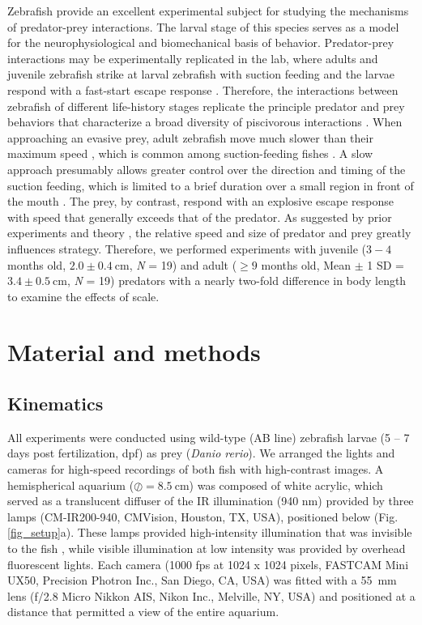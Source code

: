 \documentclass[]{rsos}%
\begin{document}
Zebrafish provide an excellent experimental subject for studying the mechanisms of predator-prey interactions. 
The larval stage of this species serves as a model for the neurophysiological \cite{Bianco:2015gm,Bagnall:2014iu,Huang:2013vj} and biomechanical \cite{Muller:2004hp,Li:2016cy} basis of behavior.
Predator-prey interactions may be experimentally replicated in the lab, where adults and juvenile zebrafish strike at larval zebrafish with suction feeding and the larvae respond with a fast-start escape response \cite{Stewart:2013bha}.
Therefore, the interactions between zebrafish of different life-history stages replicate the principle predator and prey behaviors that characterize a broad diversity of piscivorous interactions \cite{Weihs:1984tb,Walker:2005vn}. 
When approaching an evasive prey, adult zebrafish move much slower than their maximum speed \cite{Stewart:2013bha}, which is common among suction-feeding fishes \cite{Webb:1984jz,Higham:2007go}.
A slow approach presumably allows greater control over the direction and timing of the suction feeding, which is limited to a brief duration over a small region in front of the mouth \cite{Holzman:2008jc,Holzman:2009uu}. 
The prey, by contrast, respond with an explosive escape response with speed that generally exceeds that of the predator. 
As suggested by prior experiments \cite{Fuiman:1994td} and theory \cite{Weihs:1984tb}, the relative speed and size of predator and prey greatly influences strategy.
Therefore, we performed experiments with juvenile ($3-4$ months old, $2.0  \pm  \SI{0.4}{\cm}$, \textit{N} = 19) and adult ($\geq 9$ months old, Mean $\pm$ 1 SD = $3.4 \pm \SI{0.5}{\cm}$, \textit{N} = 19) predators with a nearly two-fold difference in body length to examine the effects of scale.


\section{Material and methods}

\subsection{Kinematics}
All experiments were conducted using  wild-type (AB line) zebrafish larvae (5 -- 7 days post fertilization, dpf) as prey (\textit{Danio rerio}). 
We arranged the lights and cameras for high-speed recordings of both fish with high-contrast images. 
A hemispherical aquarium ($\oslash = \SI{8.5}{\cm}$) was composed of white acrylic, which served as a translucent diffuser of the IR illumination (940 nm) provided by three lamps (CM-IR200-940, CMVision, Houston, TX, USA), positioned below (Fig. \ref{fig_setup}a). 
These lamps provided high-intensity illumination that was invisible to the fish \cite{Robinson:1993tu}, while visible illumination at low intensity was provided by overhead fluorescent lights.
Each camera (1000 fps at 1024 x 1024 pixels, FASTCAM Mini UX50, Precision Photron Inc., San Diego, CA, USA) was fitted with a \SI{55}{\mm} lens (f/2.8 Micro Nikkon AIS, Nikon Inc., Melville, NY, USA) and positioned at a distance that permitted a view of the entire aquarium. 
\end{document}
